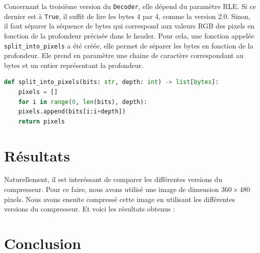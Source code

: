 \documentclass[utf8]{article}
\begin{document}
Concernant la troisième version du \texttt{Decoder}, elle dépend du paramètre RLE. Si ce dernier est à \texttt{True}, il suffit de lire les bytes 4 par 4, comme la version 2.0. Sinon, il faut séparer la séquence de bytes qui correspond aux valeurs RGB des pixels en fonction de la profondeur précisée dans le header. Pour cela, une fonction appelée \texttt{split_into_pixels} a été créée, elle permet de séparer les bytes en fonction de la profondeur. Ele prend en paramètre une chaine de caractère correspondant au bytes et un entier représentant la profondeur.

\begin{lstlisting}[language=Python, basicstyle=\small]
def split_into_pixels(bits: str, depth: int) -> list[bytes]:
    pixels = []
    for i in range(0, len(bits), depth):
	pixels.append(bits[i:i+depth])
    return pixels
\end{lstlisting}

\section{Résultats}
Naturellement, il est interéssant de comparer les différentes versions du compresseur. Pour ce faire, nous avons utilisé une image de dimension $360 \times 480$ pixels. Nous avons ensuite compressé cette image en utilisant les différentes versions du compresseur. Et voici les résultats obtenus : 


\section{Conclusion}
\end{document}
